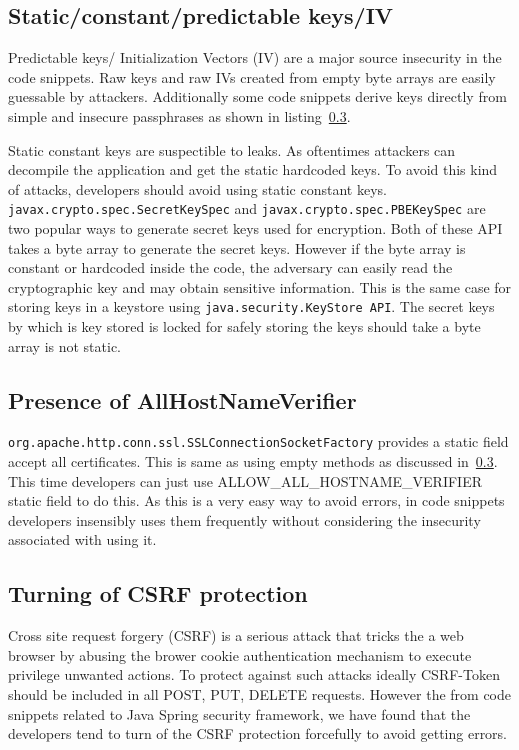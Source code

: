 \subsection{Static/constant/predictable keys/IV }
Predictable keys/ Initialization Vectors (IV) are a major source insecurity in the code snippets. Raw keys and raw IVs created from empty byte arrays
are easily guessable by attackers. Additionally some code snippets derive keys directly from simple and insecure passphrases as shown in listing~\ref{}. 

Static constant keys are suspectible to leaks. As oftentimes attackers can decompile the application and get the static hardcoded keys.  To avoid this kind of attacks, developers should avoid using static constant keys. \texttt{javax.crypto.spec.SecretKeySpec} and \texttt{javax.crypto.spec.PBEKeySpec} are two popular ways to generate secret keys used for encryption. Both of these API takes a byte array to generate the secret keys. However if the byte array is constant or hardcoded inside the code, the adversary can easily read the cryptographic key and may obtain sensitive information. This is the same case for storing keys in a keystore using \texttt{java.security.KeyStore API}. The secret keys by which is key stored is locked for safely storing the keys should take a byte array is not static.


\subsection{Presence of AllHostNameVerifier}
\texttt{org.apache.http.conn.ssl.SSLConnectionSocketFactory} provides  a static field accept all certificates. This is same as using empty methods as discussed in~\ref{}. 
This time developers can just use ALLOW\_ALL\_HOSTNAME\_VERIFIER static field to  do this. As this is a very easy way to avoid errors, in code snippets developers insensibly uses them frequently without considering the insecurity associated with using it.

\subsection{Turning of CSRF protection}
Cross site request forgery (CSRF) is a serious attack that tricks the a web browser by abusing the brower cookie authentication mechanism to execute privilege unwanted actions. To protect against such attacks ideally CSRF-Token should be included in all POST, PUT, DELETE requests.
However the from code snippets related to Java Spring security framework, we have found that the developers tend to turn of the CSRF protection forcefully to avoid getting errors. 